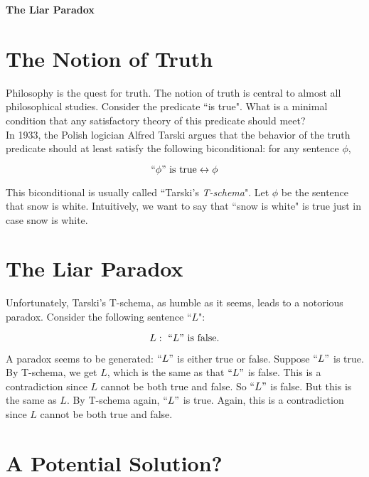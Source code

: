 \documentclass[11pt]{article}
\theoremstyle{definition}
\begin{document}




\begin{center}
{\LARGE \bf The Liar Paradox}
\end{center}

\smallskip

\section{The Notion of Truth}

Philosophy is the quest for truth. The notion of truth is central to almost all philosophical studies. Consider the predicate ``is true". What is a minimal condition that any satisfactory theory of this predicate should meet? \\

\noindent
In 1933, the Polish logician Alfred Tarski argues that the behavior of the truth predicate should at least satisfy the following biconditional: for any sentence $\phi$,

$$``\phi" \, \, \text{is true} \leftrightarrow \phi$$

\noindent
This biconditional is usually called ``Tarski's \textit{T-schema}". Let $\phi$ be the sentence that snow is white. Intuitively, we want to say that ``snow is white" is true just in case snow is white.

\section{The Liar Paradox}

Unfortunately, Tarski's T-schema, as humble as it seems, leads to a notorious paradox. Consider the following sentence ``$L$":

$$ L: \, \, ``L" \, \, \text{is false}.$$

\noindent
A paradox seems to be generated: $``L"$ is either true or false. Suppose $``L"$ is true. By T-schema, we get $L$, which is the same as that $``L"$ is false. This is a contradiction since $L$ cannot be both true and false. So $``L"$ is false. But this is the same as $L$. By T-schema again, $``L"$ is true. Again, this is a contradiction since $L$ cannot be both true and false.

\section{A Potential Solution?}
\end{document}
